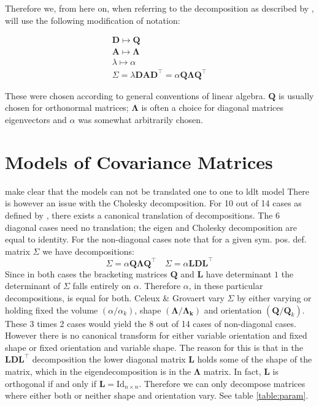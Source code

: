 Therefore we, from here on, when referring to the decomposition as described by 
\cite{Cel95}, will use the following modification of notation:

\begin{gather*} 
    \pmb{D} \longmapsto \pmb{Q} \\
    \pmb{A} \longmapsto \pmb{\Lambda} \\
    \lambda \longmapsto \alpha  \\
    \Sigma = \lambda \pmb{D} \pmb{A} \pmb{D}^\top =
        \alpha \pmb{Q} \pmb{\Lambda} \pmb{Q}^\top
\end{gather*}

These were chosen according to general conventions of linear algebra. $ \pmb{Q} $
is usually chosen for orthonormal matrices; $ \pmb{\Lambda} $ is often a choice 
for diagonal matrices eigenvectors and $ \alpha $ was somewhat arbitrarily 
chosen.


\section{Models of Covariance Matrices}

make clear that the models can not be translated one to one to ldlt model
There is however an issue with the Cholesky decomposition. For 10 out of 14
cases as defined by \cite{Cel95}, there exists a canonical translation of
decompositions.
The 6 diagonal cases need no translation; the eigen and Cholesky decomposition
are equal to identity.
For the non-diagonal cases note that for a given sym. pos. def. matrix
$ \Sigma $ we have decompositions:
\[\Sigma = \alpha \pmb{Q \Lambda Q}^\top \quad \Sigma =\alpha \pmb{L D L}^\top\]
Since in both cases the bracketing matrices $ \pmb{Q} $ and $ \pmb{L} $ have 
determinant $ 1 $ the determinant of $ \Sigma $ falls entirely on $ \alpha $.
Therefore $ \alpha $, in these particular decompositions, is equal for both.
Celeux \& Grovaert vary $\Sigma$ by either varying or holding fixed the volume 
$(\alpha / \alpha_k)$, shape $(\pmb{\Lambda} / \pmb{\Lambda_k})$ and orientation
$(\pmb{Q} / \pmb{Q}_k)$.
These 3 times 2 cases would yield the 8 out of 14 cases of non-diagonal cases.
However there is no canonical transform for either variable orientation and 
fixed shape or fixed orientation and variable shape.
The reason for this is that in the $\pmb{LDL}^\top$ decomposition the lower
diagonal matrix $\pmb{L}$ holds some of the shape of the matrix, which in 
the eigendecomposition is in the $\pmb{\Lambda}$ matrix.
In fact, $\pmb{L}$ is orthogonal if and only if 
$\pmb{L} = \mathrm{Id}_{n\times n}$.
Therefore we can only decompose matrices where either both or neither shape and
orientation vary. See table \ref{table:param}.

